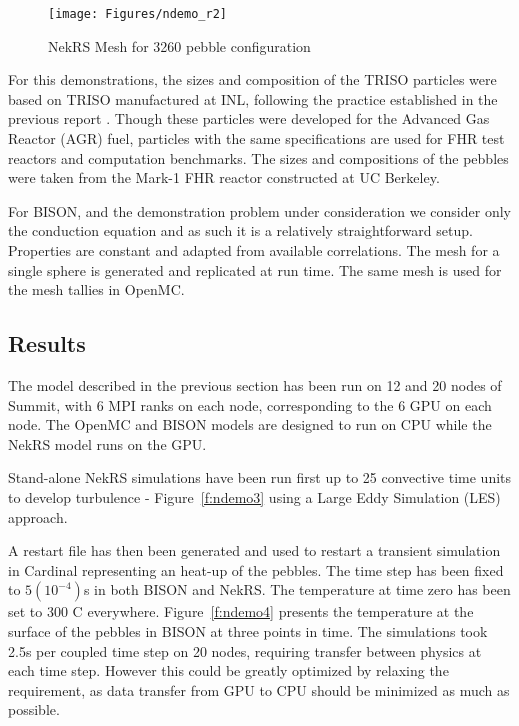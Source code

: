 \begin{figure}[!h]
\centering
\texttt{[image: Figures/ndemo\_r2]}
\caption{NekRS Mesh for 3260 pebble configuration}
\label{f:ndemo2}
\end{figure}

For this demonstrations, the sizes and composition of the TRISO particles were based on TRISO manufactured
at INL, following the practice established in the previous report \cite{cardinal}. Though these particles were developed for the Advanced Gas Reactor (AGR) fuel, particles with the same specifications are used for FHR test reactors and computation benchmarks. The sizes and compositions of the pebbles were taken from the Mark-1 FHR reactor constructed at UC Berkeley.

For BISON, and the demonstration problem under consideration we consider only the conduction equation and as such it is a relatively straightforward setup. Properties are constant and adapted from available correlations. The mesh for a single sphere is generated and replicated at run time. The same mesh is used for the mesh tallies in OpenMC.

\subsection{Results}

The model described in the previous section has been run on 12 and 20 nodes of Summit, with 6 MPI ranks on each node, corresponding to the 6 GPU on each node. The OpenMC and BISON models are designed to run on CPU while the NekRS model runs on the GPU.

Stand-alone NekRS simulations have been run first up to 25 convective time units to develop turbulence - Figure~\ref{f:ndemo3} using a Large Eddy Simulation (LES) approach.

 A restart file has then been generated and used to restart a transient simulation in Cardinal representing an heat-up of the pebbles. The time step has been fixed to $5(10^{-4})$s in both BISON and NekRS. The temperature at time zero has been set to 300 C everywhere. Figure~\ref{f:ndemo4} presents the temperature at the surface of the pebbles in BISON at three points in time. The simulations took 2.5s per coupled time step on 20 nodes, requiring transfer between physics at each time step. However this could be greatly optimized by relaxing the requirement, as data transfer from GPU to CPU should be minimized as much as possible.

